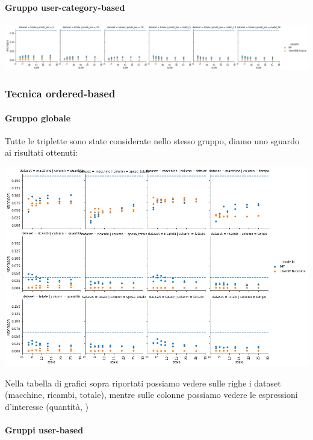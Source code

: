 \paragraph{Gruppo user-category-based}

\includegraphics[width=16cm]{figures/risultati_minmax_categoria.png}


\subsubsection{Tecnica ordered-based}

\paragraph{Gruppo globale}
Tutte le triplette sono state considerate nello stesso gruppo, diamo uno sguardo ai risultati ottenuti:

\includegraphics[width=16cm]{figures/risultati_ordered_globale.png}

Nella tabella di grafici sopra riportati possiamo vedere sulle righe i dataset (macchine, ricambi, totale), mentre sulle colonne possiamo vedere le espressioni d'interesse (quantità, )

\paragraph{Gruppi user-based}

